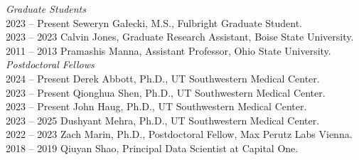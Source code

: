 \textit{Graduate Students} \\
2023 -- Present \hspace{14pt} Seweryn Gałecki, M.S., Fulbright Graduate Student. \\
2023 -- 2023 \hspace{28pt} Calvin Jones, Graduate Research Assistant, Boise State University. \\
2011 -- 2013 \hspace{28pt} Pramashis Manna, Assistant Professor, Ohio State University. \\

\textit{Postdoctoral Fellows} \\
2024 -- Present \hspace{14pt} Derek Abbott, Ph.D., UT Southwestern Medical Center. \\
2023 -- Present \hspace{14pt} Qionghua Shen, Ph.D., UT Southwestern Medical Center. \\
2023 -- Present \hspace{14pt} John Haug, Ph.D., UT Southwestern Medical Center. \\
2023 -- 2025 \hspace{28pt} Dushyant Mehra, Ph.D., UT Southwestern Medical Center. \\
2022 -- 2023 \hspace{28pt} Zach Marin, Ph.D., Postdoctoral Fellow, Max Perutz Labs Vienna. \\
2018 -- 2019 \hspace{28pt} Qiuyan Shao, Principal Data Scientist at Capital One. \\

